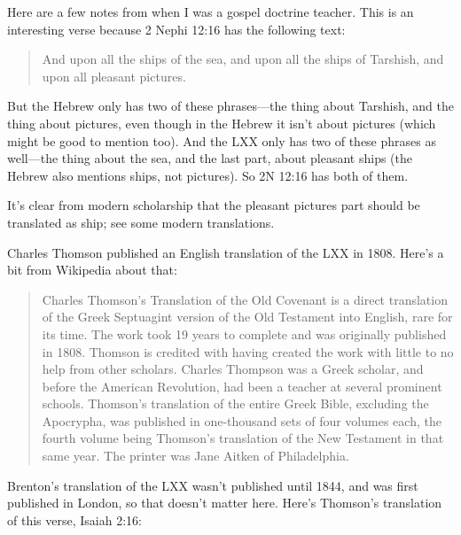 		\begin{compactdesc}
		
		\item[16$\vert$]
		\begin{compactdesc}
		\item[ships of Tarshish/pleasant pictures] Here are a few notes from when I was a gospel doctrine teacher.
			This is an interesting verse because 2 Nephi 12:16 has the following text:

			\begin{quote}
			And upon all the ships of the sea, and upon all the ships of Tarshish, and upon all pleasant pictures.
			\end{quote}

			But the Hebrew only has two of these phrases---the thing about Tarshish, and the thing about pictures, even though in the Hebrew it isn't about pictures (which might be good to mention too). And the LXX only has two of these phrases as well---the thing about the sea, and the last part, about pleasant ships (the Hebrew also mentions ships, not pictures). So 2N 12:16 has both of them. 

			It's clear from modern scholarship that the pleasant pictures part should be translated as ship; see some modern translations.

			Charles Thomson published an English translation of the LXX in 1808. Here's a bit from Wikipedia about that:

			\begin{quote}
			Charles Thomson's Translation of the Old Covenant is a direct translation of the Greek Septuagint version of the Old Testament into English, rare for its time. The work took 19 years to complete and was originally published in 1808. Thomson is credited with having created the work with little to no help from other scholars. Charles Thompson was a Greek scholar, and before the American Revolution, had been a teacher at several prominent schools. Thomson's translation of the entire Greek Bible, excluding the Apocrypha, was published in one-thousand sets of four volumes each, the fourth volume being Thomson's translation of the New Testament in that same year. The printer was Jane Aitken of Philadelphia.
			\end{quote}

			Brenton's translation of the LXX wasn't published until 1844, and was first published in London, so that doesn't matter here. Here's Thomson's translation of this verse, Isaiah 2:16:


\end{compactdesc}
\end{compactdesc}
